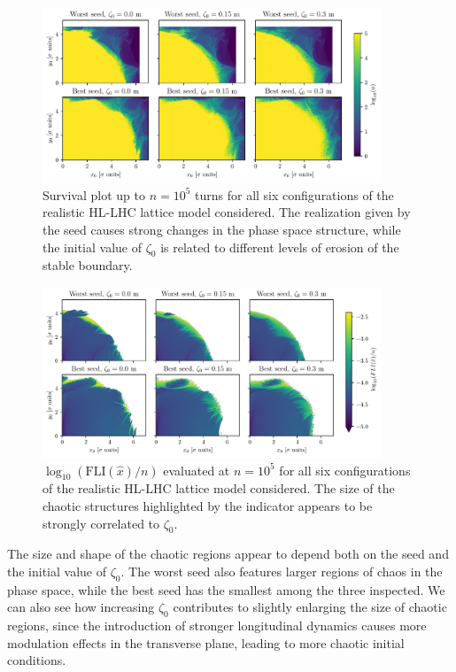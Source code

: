 \begin{figure}
    \centering
    \includegraphics[width=0.9\textwidth]{6_lhc_dynamic_indicators/figs/stability.pdf}
    \caption{Survival plot up to $n=10^5$ turns for all six configurations of the realistic HL-LHC lattice model considered. The realization given by the seed causes strong changes in the phase space structure, while the initial value of $\zeta_0$ is related to different levels of erosion of the stable boundary.}
    \label{fig:true_survivors}
\end{figure}

\begin{figure}
    \centering
    \includegraphics[width=0.9\textwidth]{6_lhc_dynamic_indicators/figs/fli_all.pdf}
    \caption{$\log_{10}(\mathrm{FLI}(\hat{x})/n)$ evaluated at $n=10^5$ for all six configurations of the realistic HL-LHC lattice model considered. The size of the chaotic structures highlighted by the indicator appears to be strongly correlated to $\zeta_0$.}
    \label{fig:fli_all}
\end{figure}

The size and shape of the chaotic regions appear to depend both on the seed and the initial value of $\zeta_0$. The worst seed also features larger regions of chaos in the phase space, while the best seed has the smallest among the three inspected. We can also see how increasing $\zeta_0$ contributes to slightly enlarging the size of chaotic regions, since the introduction of stronger longitudinal dynamics causes more modulation effects in the transverse plane, leading to more chaotic initial conditions. 

